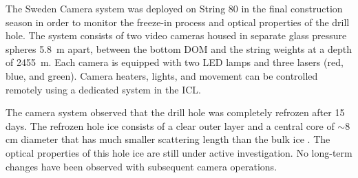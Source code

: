 The Sweden Camera system was deployed on String 80 in the final
construction season in order to monitor the freeze-in process and optical
properties of the drill hole.  The system consists of two video cameras
housed in separate glass pressure spheres \SI{5.8}{m} apart, between the
bottom DOM and the string weights at a depth of \SI{2455}{m}.  Each
camera is equipped with two LED lamps and three lasers (red, blue, and
green).  Camera heaters, lights, and movement can be controlled remotely
using a dedicated system in the ICL.  

The camera system observed that the drill hole was completely refrozen after
15 days.  The refrozen hole ice consists of a clear outer
layer and a central core of $\sim8$ cm diameter that has much
smaller scattering length than the bulk ice \cite{rongen_vlvnt15}.  The
optical properties of this hole ice are still under active investigation.
No long-term changes have been observed with subsequent camera operations.
